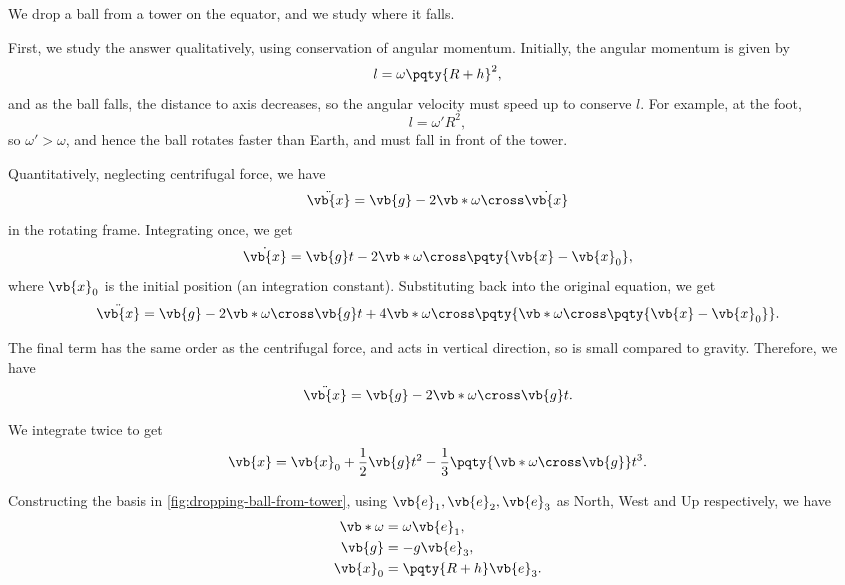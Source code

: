 \begin{example}
    \label{ex:dropping-ball-from-tower}%
    We drop a ball from a tower on the equator, and we study where it falls.

    First, we study the answer qualitatively, using conservation of angular momentum. Initially, the angular momentum is given by
    \begin{equation}
        l = \omega \pqty{R + h}^2,
    \end{equation}
    and as the ball falls, the distance to axis decreases, so the angular velocity must speed up to conserve \(l\). For example, at the foot,
    \begin{equation}
        l = \omega' R^2,
    \end{equation}
    so \(\omega' > \omega\), and hence the ball rotates faster than Earth, and must fall in front of the tower.

    Quantitatively, neglecting centrifugal force, we have
    \begin{equation}
        \ddot{\vb{x}} = \vb{g} - 2 \vb*{\omega} \cross \dot{\vb{x}}
    \end{equation}
    in the rotating frame. Integrating once, we get
    \begin{equation}
        \dot{\vb{x}} = \vb{g} t - 2 \vb*{\omega} \cross \pqty{\vb{x} - \vb{x}_0},
    \end{equation}
    where \(\vb{x}_0\) is the initial position (an integration constant). Substituting back into the original equation, we get
    \begin{equation}
        \ddot{\vb{x}} = \vb{g} - 2 \vb*{\omega} \cross \vb{g} t + 4 \vb*{\omega} \cross \pqty{\vb*{\omega} \cross \pqty{\vb{x} - \vb{x}_0}}.
    \end{equation}

    The final term has the same order as the centrifugal force, and acts in vertical direction, so is small compared to gravity. Therefore, we have
    \begin{equation}
        \ddot{\vb{x}} = \vb{g} - 2 \vb*{\omega} \cross \vb{g} t.
    \end{equation}

    We integrate twice to get
    \begin{equation}
        \vb{x} = \vb{x}_0 + \frac{1}{2} \vb{g} t^2 - \frac{1}{3} \pqty{\vb*{\omega} \cross \vb{g}} t^3.
    \end{equation}

    Constructing the basis in \autoref{fig:dropping-ball-from-tower}, using \(\vb{e}_1, \vb{e}_2, \vb{e}_3\) as North, West and Up respectively, we have
    \begin{subequations}\begin{align}
        \vb*{\omega} &= \omega \vb{e}_1, \\
        \vb{g} &= - g \vb{e}_3, \\
        \vb{x}_0 &= \pqty{R + h} \vb{e}_3.
    \end{align}\end{subequations}


\end{example}
